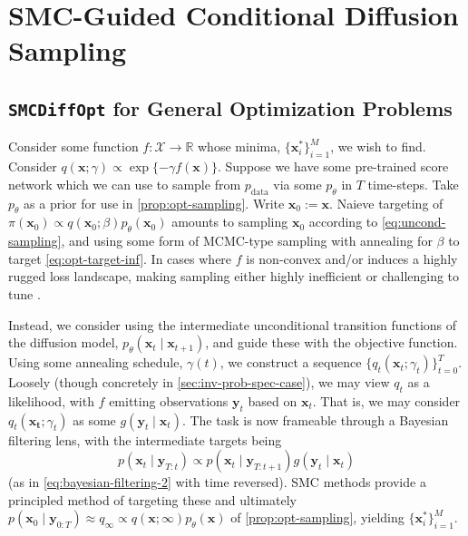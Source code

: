 \chapter{SMC-Guided Conditional Diffusion Sampling} \label{chap:methods}

\section{\texttt{SMCDiffOpt} for General Optimization Problems} \label{sec:gen-opt}

Consider some function $f: \mathcal{X} \to \mathbb{R}$ whose minima, $\{\mathbf{x}^*_i\}_{i=1}^M$,
we wish to find. Consider $q(\mathbf{x}; \gamma) \propto \exp\{-\gamma f(\mathbf{x})\}$. Suppose we
have some pre-trained score network which we can use to sample from $p_{\text{data}}$ via some
$p_\theta$ in $T$ time-steps. Take $p_\theta$ as a prior for use in  \autoref{prop:opt-sampling}. Write
$\mathbf{x}_0 := \mathbf{x}$. Naieve targeting of
$\pi(\mathbf{x}_0) \propto q(\mathbf{x}_0; \beta)p_\theta(\mathbf{x}_0)$ amounts to sampling
$\mathbf{x}_0$ according to \autoref{eq:uncond-sampling}, and using some form of MCMC-type sampling with
annealing for $\beta$ to target \autoref{eq:opt-target-inf}. In cases where $f$ is non-convex and/or
induces a highly rugged loss landscape, making sampling either highly inefficient or challenging
to tune \parencite{kongDiffusionModelsConstrained2024}.

Instead, we consider using the intermediate unconditional transition functions of the diffusion
model, $p_\theta(\mathbf{x}_{t} \mid \mathbf{x}_{t+1})$, and guide these with the objective
function. Using some annealing schedule, $\gamma(t)$, we construct a sequence
$\{q_t(\mathbf{x}_t; \gamma_t)\}_{t=0}^T$. Loosely (though concretely in
\autoref{sec:inv-prob-spec-case}), we may view $q_t$ as a likelihood, with $f$ emitting observations
$\mathbf{y}_t$ based on $\mathbf{x}_t$. That is, we may consider $q_t(\mathbf{x_t}; \gamma_t)$
as some $g(\mathbf{y}_t \mid \mathbf{x}_t)$. The task is now frameable through a Bayesian filtering
lens, with the intermediate targets being
\begin{equation}
    p(\mathbf{x}_t \mid \mathbf{y}_{T:t}) \propto p(\mathbf{x}_t \mid \mathbf{y}_{T:t+1})g(\mathbf{y}_t \mid \mathbf{x}_t)
\end{equation}
(as in \autoref{eq:bayesian-filtering-2} with time reversed). SMC methods provide a principled
method of targeting these and ultimately
$p(\mathbf{x}_0 \mid \mathbf{y}_{0:T}) \approx q_\infty \propto q(\mathbf{x}; \infty)p_\theta(\mathbf{x})$
of \autoref{prop:opt-sampling}, yielding $\{\mathbf{x}^*_i\}_{i=1}^M$.

